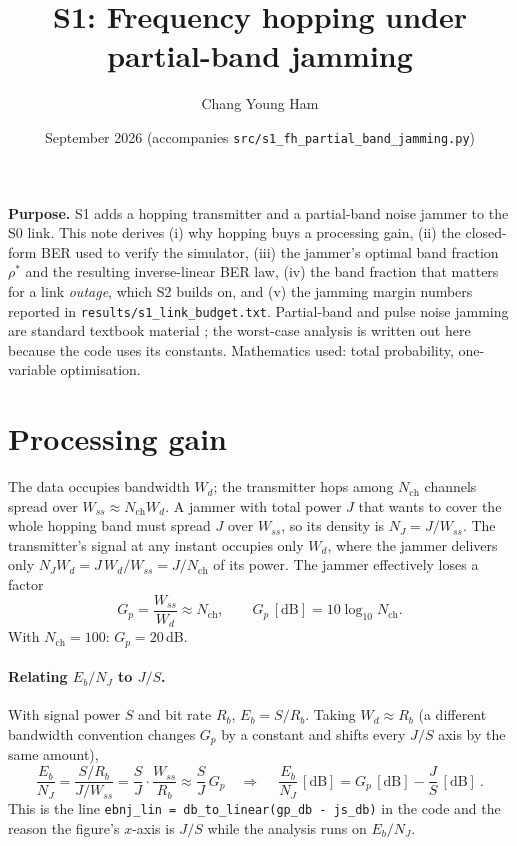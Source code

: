 \documentclass[11pt,a4paper]{article}
\title{S1: Frequency hopping under partial-band jamming}
\author{Chang Young Ham}
\date{September 2026 \quad (accompanies \texttt{src/s1\_fh\_partial\_band\_jamming.py})}
\newcommand{\EbNJ}{E_b/N_J}
\begin{document}
\maketitle

\noindent\textbf{Purpose.}
S1 adds a hopping transmitter and a partial-band noise jammer to the S0 link.
This note derives (i) why hopping buys a processing gain, (ii) the closed-form
BER used to verify the simulator, (iii) the jammer's optimal band fraction
$\rho^\ast$ and the resulting inverse-linear BER law, (iv) the band fraction
that matters for a link \emph{outage}, which S2 builds on, and (v) the jamming
margin numbers reported in \texttt{results/s1\_link\_budget.txt}.
Partial-band and pulse noise jamming are standard textbook material
\cite[Sec.~12.6]{sklar}; the worst-case analysis is written out here because
the code uses its constants.
Mathematics used: total probability, one-variable optimisation.

\section{Processing gain}

The data occupies bandwidth $W_d$; the transmitter hops among $N_{\mathrm{ch}}$
channels spread over $W_{ss}\approx N_{\mathrm{ch}}W_d$. A jammer with total
power $J$ that wants to cover the whole hopping band must spread $J$ over
$W_{ss}$, so its density is $N_J = J/W_{ss}$. The transmitter's signal at any
instant occupies only $W_d$, where the jammer delivers only
$N_J W_d = J\,W_d/W_{ss} = J/N_{\mathrm{ch}}$ of its power. The jammer
effectively loses a factor
\[
  G_p = \frac{W_{ss}}{W_d} \approx N_{\mathrm{ch}}, \qquad
  G_p\,[\mathrm{dB}] = 10\log_{10}N_{\mathrm{ch}}.
\]
With $N_{\mathrm{ch}}=100$: $G_p = 20$\,dB.

\paragraph{Relating $\EbNJ$ to $J/S$.}
With signal power $S$ and bit rate $R_b$, $E_b = S/R_b$. Taking $W_d\approx R_b$
(a different bandwidth convention changes $G_p$ by a constant and shifts every
$J/S$ axis by the same amount),
\[
  \frac{E_b}{N_J} = \frac{S/R_b}{J/W_{ss}} = \frac{S}{J}\cdot\frac{W_{ss}}{R_b}
  \approx \frac{S}{J}\,G_p
  \quad\Longrightarrow\quad
  \boxed{\ \frac{E_b}{N_J}\,[\mathrm{dB}] = G_p\,[\mathrm{dB}] - \frac{J}{S}\,[\mathrm{dB}]\ }.
\]
This is the line \texttt{ebnj\_lin = db\_to\_linear(gp\_db - js\_db)} in the code and
the reason the figure's $x$-axis is $J/S$ while the analysis runs on $\EbNJ$.
\end{document}

